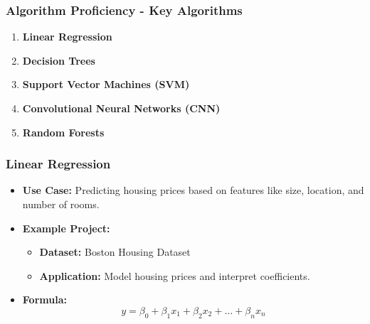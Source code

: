 \documentclass[aspectratio=169]{beamer}
\begin{document}
\begin{frame}[fragile]
    \frametitle{Algorithm Proficiency - Key Algorithms}
    \begin{enumerate}
        \item \textbf{Linear Regression}
        \item \textbf{Decision Trees}
        \item \textbf{Support Vector Machines (SVM)}
        \item \textbf{Convolutional Neural Networks (CNN)}
        \item \textbf{Random Forests}
    \end{enumerate}
\end{frame}

\begin{frame}[fragile]
    \frametitle{Linear Regression}
    \begin{itemize}
        \item \textbf{Use Case:} Predicting housing prices based on features like size, location, and number of rooms.
        \item \textbf{Example Project:}
        \begin{itemize}
            \item \textbf{Dataset:} Boston Housing Dataset
            \item \textbf{Application:} Model housing prices and interpret coefficients.
        \end{itemize}
        \item \textbf{Formula:}
        \begin{equation}
            y = \beta_0 + \beta_1 x_1 + \beta_2 x_2 + \ldots + \beta_n x_n
        \end{equation}
    \end{itemize}
\end{frame}
\end{document}
